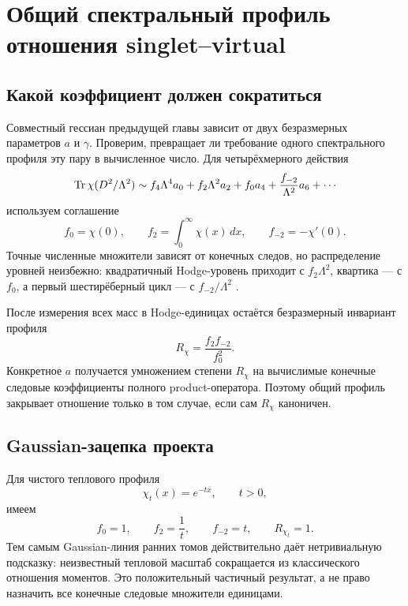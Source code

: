 \chapter{Общий спектральный профиль отношения singlet--virtual}
\label{ch:v7-common-spectral-profile-singlet-virtual-ratio-gate}

\section{Какой коэффициент должен сократиться}

Совместный гессиан предыдущей главы зависит от двух безразмерных параметров
$a$ и $\gamma$. Проверим, превращает ли требование одного спектрального
профиля эту пару в вычисленное число. Для четырёхмерного действия
\begin{equation}
 \Tr\chi(D^2/\Lambda^2)
 \sim f_4\Lambda^4a_0+f_2\Lambda^2a_2+f_0a_4
 +\frac{f_{-2}}{\Lambda^2}a_6+\cdots
 \label{eq:v7-common-profile-heat-expansion}
\end{equation}
используем соглашение
\begin{equation}
 f_0=\chi(0),\qquad
 f_2=\int_0^\infty\chi(x)\,dx,\qquad
 f_{-2}=-\chi'(0).
 \label{eq:v7-common-profile-moments}
\end{equation}
Точные численные множители зависят от конечных следов, но распределение
уровней неизбежно: квадратичный Hodge-уровень приходит с $f_2\Lambda^2$,
квартика --- с $f_0$, а первый шестирёберный цикл --- с
$f_{-2}/\Lambda^2$ \cite{v7-common-profile-spectral-action,v7-common-profile-book}.

После измерения всех масс в Hodge-единицах остаётся безразмерный инвариант
профиля
\begin{equation}
 \boxed{R_\chi=\frac{f_2f_{-2}}{f_0^2}.}
 \label{eq:v7-common-profile-invariant}
\end{equation}
Конкретное $a$ получается умножением степени $R_\chi$ на вычислимые конечные
следовые коэффициенты полного product-оператора. Поэтому общий профиль
закрывает отношение только в том случае, если сам $R_\chi$ каноничен.

\section{Gaussian-зацепка проекта}

Для чистого теплового профиля
\begin{equation}
 \chi_t(x)=e^{-tx},\qquad t>0,
 \label{eq:v7-common-profile-pure-heat}
\end{equation}
имеем
\begin{equation}
 f_0=1,\qquad f_2=\frac1t,\qquad f_{-2}=t,
 \qquad R_{\chi_t}=1.
 \label{eq:v7-common-profile-gaussian-collapse}
\end{equation}
Тем самым Gaussian-линия ранних томов действительно даёт нетривиальную
подсказку: неизвестный тепловой масштаб сокращается из классического
отношения моментов. Это положительный частичный результат, а не право
назначить все конечные следовые множители единицами.

